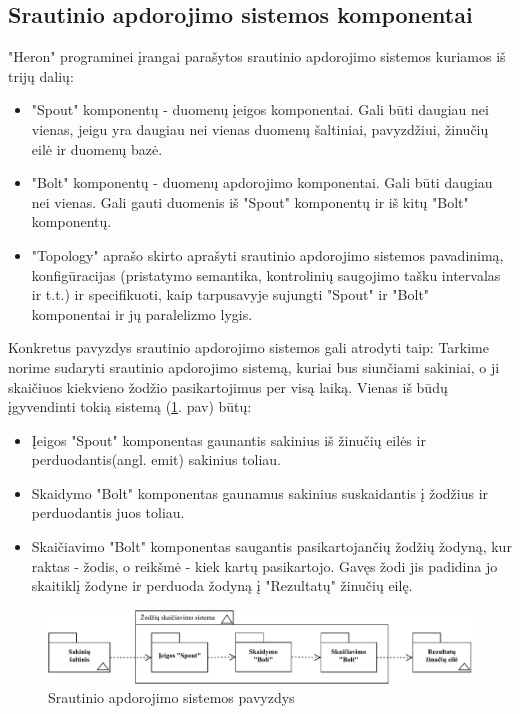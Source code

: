 \documentclass{VUMIFPSbakalaurinis}
\begin{document}
\subsection{Srautinio apdorojimo sistemos komponentai}
"Heron" programinei įrangai parašytos srautinio apdorojimo sistemos kuriamos iš trijų dalių:
\begin{itemize}
    \item "Spout" komponentų - duomenų įeigos komponentai. Gali būti daugiau nei vienas, jeigu yra daugiau nei vienas duomenų šaltiniai, pavyzdžiui, žinučių eilė ir duomenų bazė.
    \item "Bolt" komponentų - duomenų apdorojimo komponentai. Gali būti daugiau nei vienas. Gali gauti duomenis iš "Spout" komponentų ir iš kitų "Bolt" komponentų.
    \item "Topology" aprašo skirto aprašyti srautinio apdorojimo sistemos pavadinimą, konfigūracijas (pristatymo semantika, kontrolinių saugojimo tašku intervalas ir t.t.) ir specifikuoti, kaip tarpusavyje sujungti "Spout" ir "Bolt" komponentai ir jų paralelizmo lygis. 
\end{itemize}
Konkretus pavyzdys srautinio apdorojimo sistemos gali atrodyti taip:
Tarkime norime sudaryti srautinio apdorojimo sistemą, kuriai bus siunčiami sakiniai, o ji skaičiuos kiekvieno žodžio pasikartojimus per visą laiką. Vienas iš būdų įgyvendinti tokią sistemą (\ref{img:example}. pav) būtų:
\begin{itemize}
    \item Įeigos "Spout" komponentas gaunantis sakinius iš žinučių eilės ir perduodantis(angl. emit) sakinius toliau.
    \item Skaidymo "Bolt" komponentas gaunamus sakinius suskaidantis į žodžius ir perduodantis juos toliau.
    \item Skaičiavimo "Bolt" komponentas saugantis pasikartojančių žodžių žodyną, kur raktas - žodis, o reikšmė - kiek kartų pasikartojo. Gavęs žodi jis padidina jo skaitiklį žodyne ir perduoda žodyną į "Rezultatų" žinučių eilę.
\end{itemize}
\begin{figure}[H]
    \centering
    \includegraphics[width=1\textwidth]{img/pavyzdine_sistema.pdf}
    \caption{Srautinio apdorojimo sistemos pavyzdys}
    \label{img:example}
\end{figure}
\end{document}
